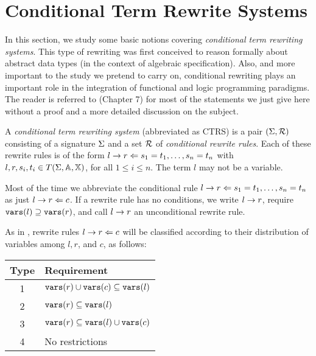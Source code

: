 \section{Conditional Term Rewrite Systems}
In this section, we study some basic notions covering \textit{conditional term rewriting systems}. This type of rewriting was first conceived to reason formally about abstract data types (in the context of algebraic specification). Also, and more important to the study we pretend to carry on, conditional rewriting plays an important role in the integration of functional and logic programming paradigms. The reader is referred to \cite{Ohlebusch:2010:ATT:1965591} (Chapter 7) for most of the statements we just give here without a proof and a more detailed discussion on the subject.

\begin{definition}
    A \textit{conditional term rewriting system} (abbreviated as CTRS) is a pair $(\Sigma, \mathcal{R})$ consisting of a signature $\Sigma$ and a set $\mathcal{R}$ of \textit{conditional rewrite rules}. Each of these rewrite rules is of the form $l \rightarrow r \Leftarrow s_1 = t_1, \dots, s_n = t_n$ with $l, r, s_i, t_i \in T(\Sigma,\mathbb{A},\mathbb{X})$, for all $1 \leq i \leq n$. The term $l$ may not be a variable.
\end{definition}

Most of the time we abbreviate the conditional rule $l \rightarrow r \Leftarrow s_1 = t_1, \dots, s_n = t_n$ as just $l \rightarrow r \Leftarrow c$. If a rewrite rule has no conditions, we write $l \rightarrow r$, require $\mathtt{vars}(l) \supseteq \mathtt{vars}(r)$, and call $l \rightarrow r$ an unconditional rewrite rule.

As in \cite{Middeldorp1994}, rewrite rules $l \rightarrow r \Leftarrow c$ will be classified according to their distribution of variables among $l, r$, and $c$, as follows:

\begin{table}[h!]
    \centering
    \begin{tabular}{c | l }
    \cline{1-2}
        Type & Requirement \\
    \hline
    1 & $\mathtt{vars}(r) \cup \mathtt{vars}(c) \subseteq \mathtt{vars}(l)$\\
    2 & $\mathtt{vars}(r) \subseteq  \mathtt{vars}(l)$ \\
    3 & $\mathtt{vars}(r) \subseteq \mathtt{vars}(l) \cup \mathtt{vars}(c)$ \\
    4 & No restrictions
    \end{tabular}
\end{table}

